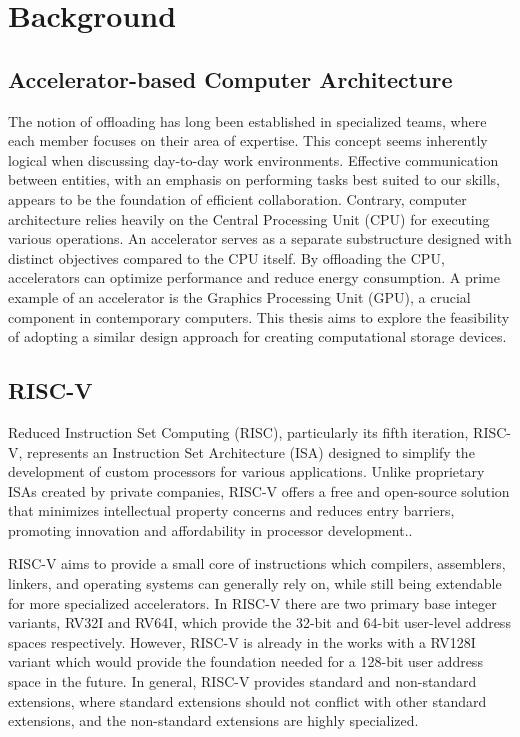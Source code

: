 \section{Background}
\subsection{Accelerator-based Computer Architecture}\label{sec:ACA}
The notion of offloading has long been established in specialized teams, where
each member focuses on their area of expertise. This concept seems inherently
logical when discussing day-to-day work environments. Effective communication
between entities, with an emphasis on performing tasks best suited to our
skills, appears to be the foundation of efficient collaboration.
Contrary, computer architecture relies heavily on the Central Processing Unit
(CPU) for executing various operations. An accelerator serves as a separate
substructure designed with distinct objectives compared to the CPU itself. By
offloading the CPU, accelerators can optimize performance and reduce energy
consumption\cite{AA}. A prime example of an accelerator is the Graphics
Processing Unit (GPU), a crucial component in contemporary computers.
This thesis aims to explore the feasibility of adopting a similar design
approach for creating computational storage devices.

\subsection{RISC-V}
Reduced Instruction Set Computing (RISC), particularly its fifth iteration,
RISC-V, represents an Instruction Set Architecture (ISA) designed to simplify
the development of custom processors for various applications. Unlike
proprietary ISAs created by private companies, RISC-V offers a free and
open-source solution that minimizes intellectual property concerns and reduces
entry barriers, promoting innovation and affordability in processor
development.\cite{ISAfree}.

RISC-V aims to provide a small core of instructions which compilers, assemblers,
linkers, and operating systems can generally rely on, while still being
extendable for more specialized accelerators. In RISC-V there are two primary
base integer variants, RV32I and RV64I, which provide the 32-bit and 64-bit
user-level address spaces respectively. However, RISC-V is already in the works
with a RV128I variant which would provide the foundation needed for a 128-bit
user address space in the future. In general, RISC-V provides standard and
non-standard extensions, where standard extensions should not conflict with
other standard extensions, and the non-standard extensions are highly
specialized.

